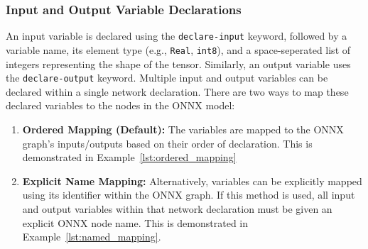 \subsubsection*{Input and Output Variable Declarations}
\label{sec:input-output-declarations}
An input variable is declared using the \texttt{declare-input} keyword, followed by a variable name, its element type (e.g., \texttt{Real}, \texttt{int8}), 
and a space-seperated list of integers representing the shape of the tensor. Similarly, an output variable uses the \texttt{declare-output} keyword. Multiple 
input and output variables can be declared within a single network declaration. There are two ways to map these declared variables to the nodes in the ONNX model:
\begin{enumerate}
    \item \textbf{Ordered Mapping (Default):} The variables are mapped to the ONNX graph's inputs/outputs based on their order of declaration. This is demonstrated in Example~\ref{lst:ordered_mapping}
    \item \textbf{Explicit Name Mapping:} Alternatively, variables can be explicitly mapped using its identifier within the ONNX graph. If this method is used, all input and output 
        variables within that network declaration must be given an explicit ONNX node name. This is demonstrated in Example~\ref{lst:named_mapping}.
\end{enumerate}

